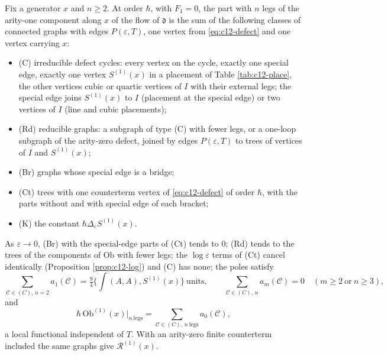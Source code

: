 \begin{theorem}
\label{thm:c12-classes}
Fix a generator $x$ and $n\ge2$. At order $\hbar$, with $F_1=0$, the part with $n$ legs of the arity-one component along $x$ of the flow of $\mathfrak d$ is the sum of the following classes of connected graphs with edges $P(\varepsilon,T)$, one vertex from \eqref{eq:c12-defect} and one vertex carrying $x$:
\begin{itemize}
\item (C) irreducible defect cycles: every vertex on the cycle, exactly one special edge, exactly one vertex $S^{(1)}(x)$ in a placement of Table \ref{tab:c12-place}, the other vertices cubic or quartic vertices of $I$ with their external legs; the special edge joins $S^{(1)}(x)$ to $I$ (placement at the special edge) or two vertices of $I$ (line and cubic placements);
\item (Rd) reducible graphs: a subgraph of type (C) with fewer legs, or a one-loop subgraph of the arity-zero defect, joined by edges $P(\varepsilon,T)$ to trees of vertices of $I$ and $S^{(1)}(x)$;
\item (Br) graphs whose special edge is a bridge;
\item (Ct) trees with one counterterm vertex of \eqref{eq:c12-defect} of order $\hbar$, with the parts without and with special edge of each bracket;
\item (K) the constant $\hbar\Delta_\varepsilon S^{(1)}(x)$.
\end{itemize}
As $\varepsilon\to0$, (Br) with the special-edge parts of (Ct) tends to $0$; (Rd) tends to the trees of the components of $\mathrm{Ob}$ with fewer legs; the $\log\varepsilon$ terms of (Ct) cancel identically (Proposition \ref{prop:c12-log}) and (C) has none; the poles satisfy
\begin{equation}
\sum_{\mathcal C\in(C),\,n=2}a_1(\mathcal C)=\tfrac94\Big\{\int(A,A),S^{(1)}(x)\Big\}\ \text{units},\qquad \sum_{\mathcal C\in(C),\,n}a_m(\mathcal C)=0\quad(m\ge2\ \text{or}\ n\ge3),
\label{eq:c12-pole}
\end{equation}
and
\begin{equation}
\hbar\,\mathrm{Ob}^{(1)}(x)\big|_{n\ \text{legs}}=\sum_{\mathcal C\in(C),\,n\ \text{legs}}a_0(\mathcal C),
\label{eq:c12-local1}
\end{equation}
a local functional independent of $T$. With an arity-zero finite counterterm included the same graphs give $\mathcal R^{(1)}(x)$.
\end{theorem}

